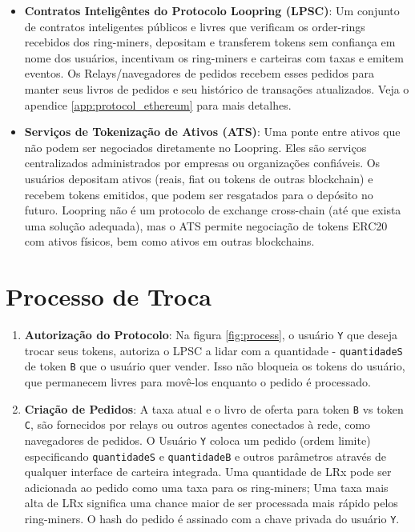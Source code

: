 \documentclass[UTF8,nofonts]{article}
\begin{document}
\begin{multicols}{2}
\begin{itemize}
\item \textbf{Contratos Inteligêntes do Protocolo Loopring (LPSC)}: Um conjunto de contratos inteligentes públicos e livres que verificam os order-rings recebidos dos ring-miners, depositam e transferem tokens sem confiança em nome dos usuários, incentivam os ring-miners e carteiras com taxas e emitem eventos. Os Relays/navegadores de pedidos recebem esses pedidos para manter seus livros de pedidos e seu histórico de transações atualizados. Veja o apendice \ref{app:protocol_ethereum} para mais detalhes.

\item \textbf{Serviços de Tokenização de Ativos (ATS)}: Uma ponte entre ativos que não podem ser negociados diretamente no Loopring. Eles são serviços centralizados administrados por empresas ou organizações confiáveis. Os usuários depositam ativos (reais, fiat ou tokens de outras blockchain) e recebem tokens emitidos, que podem ser resgatados para o depósito no futuro. Loopring não é um protocolo de exchange cross-chain  (até que exista uma solução adequada), mas o ATS permite negociação de tokens ERC20 \cite{ERC20} com ativos físicos, bem como ativos em outras blockchains.

\end{itemize}


\section{Processo de Troca\label{sec:process}}



\begin{enumerate} 


\item \textbf{Autorização do Protocolo}: Na figura \ref{fig:process}, o usuário \verb|Y| que deseja trocar seus tokens, autoriza o LPSC a lidar com a quantidade - \verb|quantidadeS| de token \verb|B| que o usuário quer vender. Isso não bloqueia os tokens do usuário, que permanecem livres para movê-los enquanto o pedido é processado.

\item \textbf{Criação de Pedidos}: A taxa atual e o livro de oferta para token \verb|B| vs token \verb|C|, são fornecidos por relays ou outros agentes conectados à rede, como navegadores de pedidos. O Usuário \verb|Y| coloca um pedido (ordem limite) especificando \verb|quantidadeS| e \verb|quantidadeB| e outros parâmetros através de qualquer interface de carteira integrada. Uma quantidade de LRx pode ser adicionada ao pedido como uma taxa para os ring-miners; Uma taxa mais alta de LRx significa uma chance maior de ser processada mais rápido pelos ring-miners. O hash do pedido é assinado com a chave privada do usuário \verb|Y|.


\end{enumerate}
\end{multicols}
\end{document}
